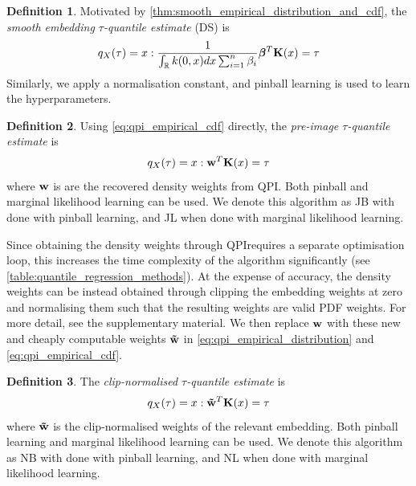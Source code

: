 \documentclass[twoside]{article} \usepackage{aistats2017}
\theoremstyle{definition}
\newtheorem{definition}{Definition}[section]
\theoremstyle{theorem}
\newcommand{\rv}[1]{{#1}}
\newcommand{\qpi}{QPI}
\begin{document}
	\theoremstyle{definition}
	\begin{definition}
		Motivated by \cref{thm:smooth_empirical_distribution_and_cdf}, the \textit{smooth embedding $\tau$-quantile estimate} (DS) is
		\begin{equation}
		q_{\rv{X}}(\tau) = x : \frac{1}{\int_{\mathbb{R}} k(0, x) dx \sum_{i = 1}^{n} \beta_{i}} \bm{\beta}^{T} \bvec{K}(x) = \tau
		\end{equation}	
		Similarly, we apply a normalisation constant, and pinball learning is used to learn the hyperparameters.
	\end{definition}
	
	\theoremstyle{definition}
	\begin{definition}
		Using \eqref{eq:qpi_empirical_cdf} directly, the \textit{pre-image $\tau$-quantile estimate} is
		\begin{equation}
			q_{\rv{X}}(\tau) = x : \bvec{w}^{T} \bvec{K}(x) = \tau
		\end{equation}	
		where $\mathbf{w}$ is are the recovered density weights from QPI.
		Both pinball and marginal likelihood learning can be used. We denote this algorithm as JB with done with pinball learning, and JL when done with marginal likelihood learning.
	\end{definition}
	
	Since obtaining the density weights through \qpi\space requires a separate optimisation loop, this increases the time complexity of the algorithm significantly (see \cref{table:quantile_regression_methods}). At the expense of accuracy, the density weights can be instead obtained through clipping the embedding weights at zero and normalising them such that the resulting weights are valid PDF weights. For more detail, see the supplementary material. We then replace $\mathbf{w}$ with these new and cheaply computable weights $\mathbf{\tilde{w}}$ in \eqref{eq:qpi_empirical_distribution} and \eqref{eq:qpi_empirical_cdf}.
%
%

	\theoremstyle{definition}
	\begin{definition}
		The \textit{clip-normalised $\tau$-quantile estimate} is
		\begin{equation}
		q_{\rv{X}}(\tau) = x : \bvec{\tilde{w}}^{T} \bvec{K}(x) = \tau
		\end{equation}
		where $\mathbf{\tilde{w}}$ is the clip-normalised weights of the relevant embedding.
		Both pinball learning and marginal likelihood learning can be used. We denote this algorithm as NB with done with pinball learning, and NL when done with marginal likelihood learning.
	\end{definition}	
	
\end{document}
